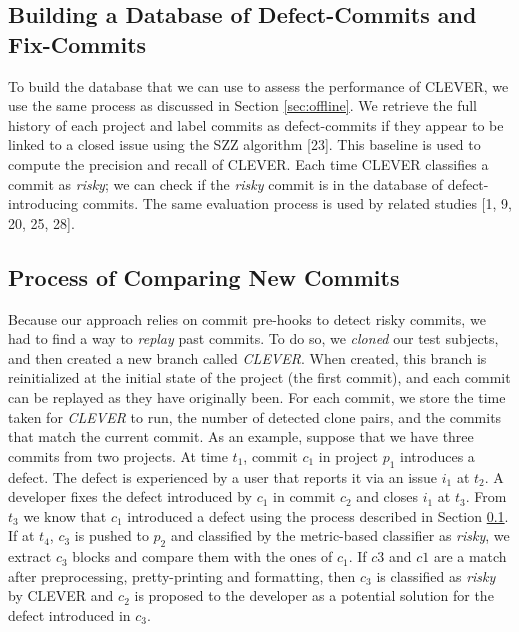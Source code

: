 \documentclass[sigconf]{acmart}
\begin{document}
\subsection{Building a Database of Defect-Commits and
Fix-Commits}\label{sub:golden}

To build the database that we can use to assess the performance of
CLEVER, we use the same process as discussed in Section
\ref{sec:offline}. We retrieve the full history of each project and
label commits as defect-commits if they appear to be linked to a closed
issue using the SZZ algorithm [23]. This baseline is used to compute
the precision and recall of CLEVER. Each time CLEVER classifies a commit
as \emph{risky}; we can check if the \emph{risky} commit is in the
database of defect-introducing commits. The same evaluation process is
used by related studies [1, 9, 20, 25, 28].

\subsection{Process of Comparing New Commits}\label{sec:newcommits}

Because our approach relies on commit pre-hooks to detect risky commits,
we had to find a way to \emph{replay} past commits. To do so, we
\emph{cloned} our test subjects, and then created a new branch called
\emph{CLEVER}. When created, this branch is reinitialized at the initial
state of the project (the first commit), and each commit can be replayed
as they have originally been. For each commit, we store the time taken
for \emph{CLEVER} to run, the number of detected clone pairs, and the
commits that match the current commit. As an example, suppose that we
have three commits from two projects. At time \(t_1\), commit \(c_1\) in
project \(p_1\) introduces a defect. The defect is experienced by a user
that reports it via an issue \(i_1\) at \(t_2\). A developer fixes the
defect introduced by \(c_1\) in commit \(c_2\) and closes \(i_1\) at
\(t_3\). From \(t_3\) we know that \(c_1\) introduced a defect using the
process described in Section \ref{sub:golden}. If at \(t_4\), \(c_3\) is
pushed to \(p_2\) and classified by the metric-based classifier as
\emph{risky}, we extract \(c_3\) blocks and compare them with the ones
of \(c_1\). If \(c3\) and \(c1\) are a match after preprocessing,
pretty-printing and formatting, then \(c_3\) is classified as
\emph{risky} by CLEVER and \(c_2\) is proposed to the developer as a
potential solution for the defect introduced in \(c_3\).
\end{document}
